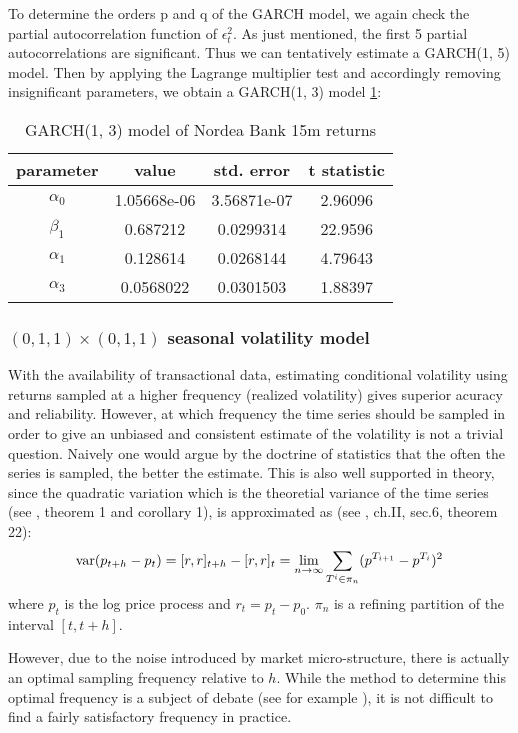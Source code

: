\documentclass{book}
\begin{document}
To determine the orders p and q of the GARCH model, we again check
the partial autocorrelation function of $\epsilon_t^2$. As just
mentioned, the first 5 partial autocorrelations are significant. Thus
we can tentatively estimate a GARCH(1, 5) model. Then by applying the
Lagrange multiplier test and accordingly removing insignificant
parameters, we obtain a GARCH(1, 3) model
\ref{tab:nordea_15min_garch}:
\begin{table}[htb!]
  \centering
  \begin{tabular}{c|c|c|c}
    parameter & value & std. error & t statistic \\
    \hline
     $\alpha_0$ &   1.05668e-06 &   3.56871e-07 &    2.96096\\
     \hline
     $\beta_1$  &     0.687212  &   0.0299314   &    22.9596\\
     \hline
     $\alpha_1$ &      0.128614 &   0.0268144   &    4.79643\\
     \hline
     $\alpha_3$ &    0.0568022  &   0.0301503   &    1.88397
  \end{tabular}
  \caption{GARCH(1, 3) model of Nordea Bank 15m returns}
  \label{tab:nordea_15min_garch}
\end{table}

\subsubsection{$(0,1,1)\times(0, 1, 1)$ seasonal volatility model}
With the availability of transactional data, estimating conditional
volatility using returns sampled at a higher frequency (realized
volatility) gives superior acuracy and reliability. However, at which
frequency the time series should be sampled in order to give an
unbiased and consistent estimate of the volatility is not a trivial
question. Naively one would argue by the doctrine of statistics that
the often the series is sampled, the better the estimate. This is also
well supported in theory, since the quadratic variation which is the
theoretial variance of the time series (see \cite{Andersen03}, theorem
1 and corollary 1), is approximated as (see \cite{Protter05}, ch.II,
sec.6, theorem 22):
\[
\text{var}(p_{t+h} - p_t) = [r, r]_{t+h} - [r, r]_t = \lim_{n \to \infty}
\sum_{T^i \in \pi_n} (p^{T_{i+1}} - p^{T_i})^2
\]
where $p_t$ is the log price process and $r_t = p_t - p_0$. $\pi_n$
is a refining partition of the interval $[t, t+h]$.

However, due to the noise introduced by market micro-structure, there
is actually an optimal sampling frequency relative to $h$. While the
method to determine this optimal frequency is a subject of debate (see
for example \cite{Sahalia05}), it is not difficult to find a fairly
satisfactory frequency in practice.
\end{document}
